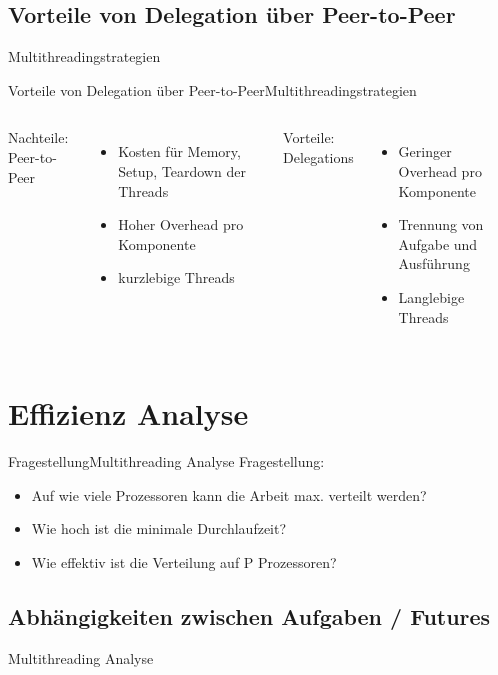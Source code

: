\documentclass{beamer}
\begin{document}
\subsection{Vorteile von Delegation \"uber Peer-to-Peer}{Multithreadingstrategien}
\begin{frame}{Vorteile von Delegation \"uber Peer-to-Peer}{Multithreadingstrategien}

\begin{columns}
        Nachteile: Peer-to-Peer 
        
        \begin{itemize}
        \item Kosten f\"ur Memory, Setup, Teardown der Threads
        \item Hoher Overhead pro Komponente
        \item kurzlebige Threads
        \end{itemize}
        Vorteile: Delegations 
        \begin{itemize}
        \item Geringer Overhead pro Komponente
        \item Trennung von Aufgabe und Ausf\"uhrung
        \item Langlebige Threads
        \end{itemize}
    
\end{columns}
\end{frame}



\section{Effizienz Analyse}


\begin{frame}{Fragestellung}{Multithreading Analyse}
Fragestellung:
\begin{itemize}
\item Auf wie viele Prozessoren kann die Arbeit max. verteilt werden?
\item Wie hoch ist die minimale Durchlaufzeit?
\item Wie effektiv ist die Verteilung auf P Prozessoren?
\end{itemize}
\end{frame}

\subsection{Abh\"angigkeiten zwischen Aufgaben / Futures}{Multithreading Analyse}
\end{document}
